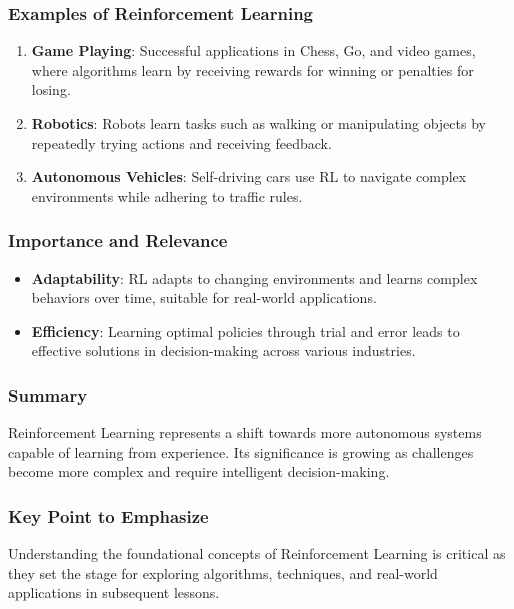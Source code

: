 \documentclass[aspectratio=169]{beamer}
\begin{document}
\begin{frame}[fragile]
    \frametitle{Examples of Reinforcement Learning}
    \begin{enumerate}
        \item \textbf{Game Playing}: Successful applications in Chess, Go, and video games, where algorithms learn by receiving rewards for winning or penalties for losing.
        \item \textbf{Robotics}: Robots learn tasks such as walking or manipulating objects by repeatedly trying actions and receiving feedback.
        \item \textbf{Autonomous Vehicles}: Self-driving cars use RL to navigate complex environments while adhering to traffic rules.
    \end{enumerate}
\end{frame}

\begin{frame}[fragile]
    \frametitle{Importance and Relevance}
    \begin{itemize}
        \item \textbf{Adaptability}: RL adapts to changing environments and learns complex behaviors over time, suitable for real-world applications.
        \item \textbf{Efficiency}: Learning optimal policies through trial and error leads to effective solutions in decision-making across various industries.
    \end{itemize}
\end{frame}

\begin{frame}[fragile]
    \frametitle{Summary}
    Reinforcement Learning represents a shift towards more autonomous systems capable of learning from experience. Its significance is growing as challenges become more complex and require intelligent decision-making.
\end{frame}

\begin{frame}[fragile]
    \frametitle{Key Point to Emphasize}
    Understanding the foundational concepts of Reinforcement Learning is critical as they set the stage for exploring algorithms, techniques, and real-world applications in subsequent lessons.
\end{frame}
\end{document}

